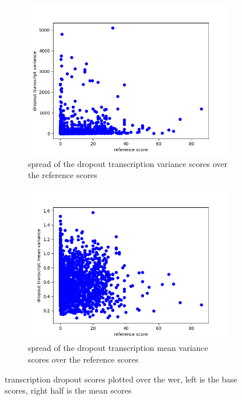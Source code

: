     \begin{figure}
        \centering%
    \begin{subfigure}{0.4\linewidth}
        \includegraphics[width=\textwidth]{Latex/sections/images/seamlessdropouttranscriptvar.png}
        \caption{spread of the dropout transcription variance scores over the reference scores}
    \end{subfigure}
    \begin{subfigure}{0.4\linewidth}
        \includegraphics[width=\textwidth]{Latex/sections/images/seamlessdropouttranscriptmeanvar.png}
        \caption{spread of the dropout transcription mean variance scores over the reference scores}
    \end{subfigure}
    \caption{transcription dropout scores plotted over the wer, left is the base scores, right half is the mean scores}
    \label{fig:dropout transcript variance scores}
    \end{figure}
    
